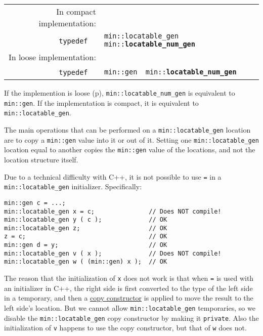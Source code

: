 \documentclass[12pt]{article}
\makeatletter
\newcommand{\ttindex}[1]{\index{#1@{\tt #1}}}
\newcommand{\minindex}[1]{\ttindex{min::#1}\ttindex{#1}}
\newcommand{\pagref}[1]{p\pageref{#1}}
\newcommand{\EOL}{\penalty \exhyphenpenalty}
\newenvironment{indpar}[1][0.3in]%
	{\begin{list}{}%
		     {\setlength{\itemsep}{0in}%
		      \setlength{\topsep}{0in}%
		      \setlength{\parsep}{1ex}%
		      \setlength{\labelwidth}{#1}%
		      \setlength{\leftmargin}{#1}%
		      \addtolength{\leftmargin}{\labelsep}}%
	 \item}%
	{\end{list}}
\newcommand{\LABEL}[1]{\label{#1}}
\newcommand{\MINKEY}[1]{{\tt \bf #1}\minindex{#1}}
\makeatother
\begin{document}
\begin{indpar}[0.1in]\begin{tabular}{r@{}l}
In compact implementation: \\
~~~~\verb|typedef  |
	& \verb|min::locatable_gen  min::|\MINKEY{locatable\_num\_gen} \\
In loose implementation: \\
~~~~\verb|typedef  |
	& \verb|min::gen  min::|\MINKEY{locatable\_num\_gen}
\LABEL{MIN::LOCATABLE_NUM_GEN_TYPEDEF} \\
\end{tabular}\end{indpar}

If the implemention is loose (\pagref{LOOSE}),
{\tt min::locatable\_\EOL num\_\EOL gen} is equivalent to
{\tt min::gen}.  If the implementation is compact, it is equivalent to
{\tt min::locatable\_\EOL gen}.

The main operations that can be performed on a
{\tt min::locatable\_\EOL gen} location are to copy a {\tt min::gen}
value into it or out of it.  Setting one {\tt min::\EOL locatable\_\EOL gen}
location equal to another copies the {\tt min::gen} value of the locations,
and not the location structure itself.

Due to a technical difficulty with C++, it is not possible to use
{\tt =} in a {\tt min::\EOL locatable\_\EOL gen} initializer.
Specifically:

\begin{indpar}\begin{verbatim}
min::gen c = ...;
min::locatable_gen x = c;               // Does NOT compile!
min::locatable_gen y ( c );             // OK
min::locatable_gen z;                   // OK
z = c;                                  // OK
min::gen d = y;                         // OK
min::locatable_gen v ( x );             // Does NOT compile!
min::locatable_gen w ( (min::gen) x );  // OK
\end{verbatim}\end{indpar}

The reason that the initialization of {\tt x} does not work is that
\label{LOCATABLE-VAR-COPY-CONSTRUCTOR}
when {\tt =} is used with an initializer in C++, the right side is
first converted to the type of the left side in a temporary, and then a
\underline{copy constructor} is applied to move the result to the
left side's location.  But we cannot allow {\tt min::\EOL locatable\_\EOL gen}
temporaries, so we disable the {\tt min::\EOL locatable\_\EOL gen}
copy constructor by making it {\tt private}.  Also the initialization
of {\tt v} happens to use the copy constructor, but that of {\tt w} does not.
\end{document}
